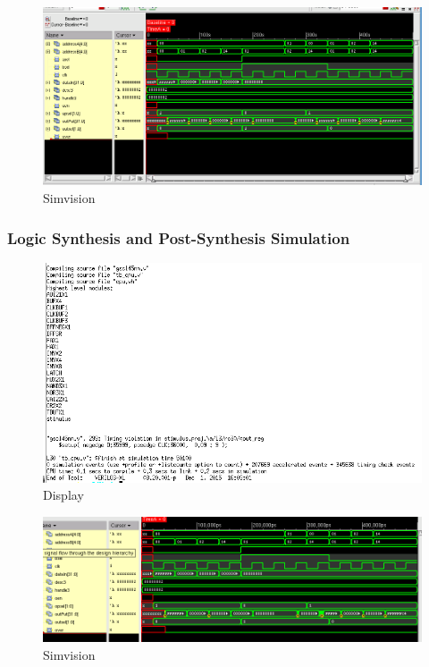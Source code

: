 \documentclass[12pt]{article}
\begin{document}
\begin{figure}[H]
\centering
\includegraphics[width=\linewidth]{../CSeA/CSeA-test}
\caption{Simvision}
\label{fig:CSeA-test}
\end{figure}

\subsubsection{Logic Synthesis and Post-Synthesis Simulation}
\begin{figure}[H]
\centering
\includegraphics[width=.7\linewidth]{../CSeA/synth-text}
\caption{Display}
\label{fig:synth-text}
\end{figure}
\begin{figure}[H]
\centering
\includegraphics[width=\linewidth]{../CSeA/synth-test}
\caption{Simvision}
\label{fig:synth-test}
\end{figure}
\end{document}
